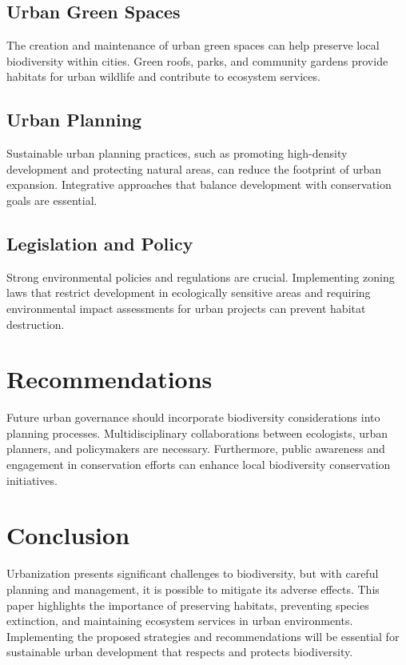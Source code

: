\documentclass[12pt]{article}
\begin{document}
\subsection{Urban Green Spaces}
The creation and maintenance of urban green spaces can help preserve local biodiversity within cities. Green roofs, parks, and community gardens provide habitats for urban wildlife and contribute to ecosystem services.

\subsection{Urban Planning}
Sustainable urban planning practices, such as promoting high-density development and protecting natural areas, can reduce the footprint of urban expansion. Integrative approaches that balance development with conservation goals are essential.

\subsection{Legislation and Policy}
Strong environmental policies and regulations are crucial. Implementing zoning laws that restrict development in ecologically sensitive areas and requiring environmental impact assessments for urban projects can prevent habitat destruction.

\section{Recommendations}
Future urban governance should incorporate biodiversity considerations into planning processes. Multidisciplinary collaborations between ecologists, urban planners, and policymakers are necessary. Furthermore, public awareness and engagement in conservation efforts can enhance local biodiversity conservation initiatives.

\section{Conclusion}
Urbanization presents significant challenges to biodiversity, but with careful planning and management, it is possible to mitigate its adverse effects. This paper highlights the importance of preserving habitats, preventing species extinction, and maintaining ecosystem services in urban environments. Implementing the proposed strategies and recommendations will be essential for sustainable urban development that respects and protects biodiversity.



\end{document}
